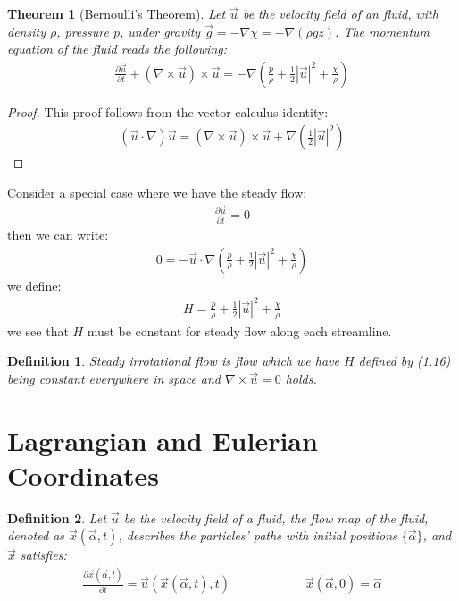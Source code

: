 \documentclass[11pt]{book}
\theoremstyle{break}
\theoremstyle{break}
\newtheorem{thm}{Theorem}[section]
\newtheorem{defn}{Definition}[corL]
\begin{document}
\begin{thm}[Bernoulli's Theorem]
Let $\vec{u}$ be the velocity field of an fluid, with density $\rho$, pressure $p$, under gravity $\vec{g} = -\nabla \chi = -\nabla (\rho g z)$. The momentum equation of the fluid reads the following:
\begin{align}
\frac{\partial \vec{u}}{\partial t} + (\nabla \times \vec{u}) \times \vec{u} = -\nabla \left( \frac{p}{\rho} + \frac{1}{2} |\vec{u}|^2 + \frac{\chi}{\rho}\right)
\end{align}
\end{thm}
\begin{proof}
This proof follows from the vector calculus identity:
\begin{align*}
(\vec{u}\cdot \nabla ) \vec{u} = (\nabla \times \vec{u}) \times \vec{u}+ \nabla \left(\frac{1}{2}|\vec{u}|^2\right)
\end{align*}
\end{proof}

Consider a special case where we have the steady flow:
\begin{align*}
\frac{\partial \vec{u}}{\partial t} = 0
\end{align*}
then we can write:
\begin{align*}
0 = -\vec{u}\cdot \nabla \left( \frac{p}{\rho} + \frac{1}{2}|\vec{u}|^2 + \frac{\chi}{\rho}\right) 
\end{align*}
we define:
\begin{align}
H = \frac{p}{\rho} + \frac{1}{2}|\vec{u}|^2 + \frac{\chi}{\rho}
\end{align}
we see that $H$ must be constant for steady flow along each streamline. 

\begin{defn}
Steady irrotational flow is flow which we have $H$ defined by (1.16) being constant everywhere in space and $\nabla \times \vec{u} = 0$ holds. 
\end{defn}


\newpage
\section[Lagrangian and Eulerian Coordinates]{\color{red}Lagrangian and Eulerian  Coordinates\color{black}}
\begin{defn}
Let $\vec{u}$ be the velocity field of a fluid, the flow map of the fluid, denoted as $\vec{x}(\vec{\alpha}, t)$, describes the particles' paths with initial positions $\{\vec{\alpha}\}$, and $\vec{x}$ satisfies:
\begin{align*}
\frac{\partial \vec{x}(\vec{\alpha},t)}{\partial t}= \vec{u}(\vec{x}
(\vec{\alpha},t),t) \qquad\qquad\qquad \vec{x}(\vec{\alpha},0) = \vec{\alpha}
\end{align*}
\end{defn}
\end{document}
